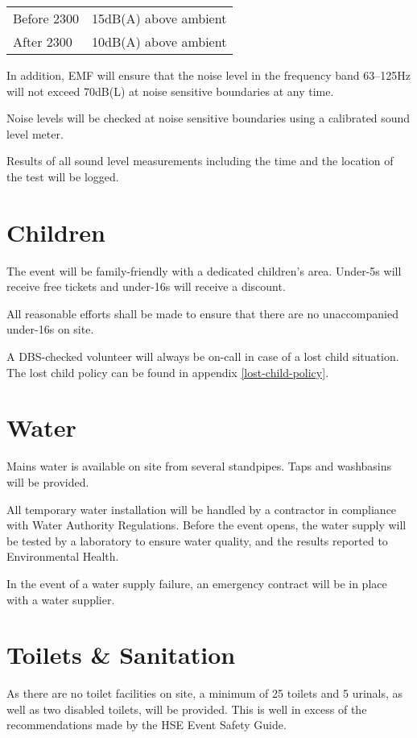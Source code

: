 \begin{tabular}{l l}
  Before 2300 & 15dB(A) above ambient\\
  After 2300 & 10dB(A) above ambient\\
\end{tabular}

In addition, EMF will ensure that the noise level in the frequency band 63--125Hz will not exceed 70dB(L)
at noise sensitive boundaries at any time.

Noise levels will be checked at noise sensitive boundaries using a calibrated sound level meter.

Results of all sound level measurements including the time and the location of the test will be logged.

\section{Children}

The event will be family-friendly with a dedicated children's area. Under-5s will receive free tickets
and under-16s will receive a discount.

All reasonable efforts shall be made to ensure that there are no unaccompanied under-16s on site.

A DBS-checked volunteer will always be on-call in case of a lost child situation. The lost child
policy can be found in appendix \ref{lost-child-policy}.

\section{Water}
Mains water is available on site from several standpipes. Taps and washbasins will be provided.

All temporary water installation will be handled by a contractor in compliance with Water Authority Regulations.
Before the event opens, the water supply will be tested by a laboratory to ensure water quality, and the results
reported to Environmental Health.

In the event of a water supply failure, an emergency contract will be in place with a water supplier.

\section{Toilets \& Sanitation}

As there are no toilet facilities on site, a minimum of 25 toilets and 5 urinals, as well as two disabled toilets,
will be provided. This is well in excess of the recommendations made by the HSE Event Safety Guide.

